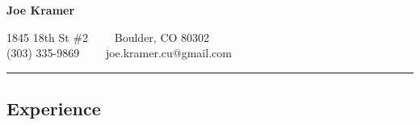\documentclass[11pt,letterpaper]{article}
\newcommand{\CPP}
{C\nolinebreak[4]\hspace{-.05em}\raisebox{.22ex}{\footnotesize\bf ++}}
\begin{document}
\begin{center}
{\LARGE \textbf{Joe Kramer}}

\vspace{0.8em}

1845 18th St \#2\ \ \textbullet
\ \ Boulder, CO 80302
\\
(303) 335-9869\ \ \textbullet
\ \ joe.kramer.cu@gmail.com
\end{center}


\vspace{0.8em}
\hrule
\vspace{-0.4em}
\subsection*{Experience}
\end{document}
